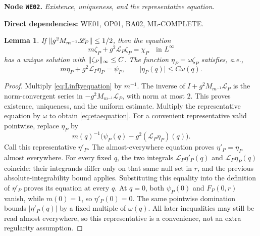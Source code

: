 \documentclass[11pt,a4paper]{article}
\newtheorem{lemma}[theorem]{Lemma}
\theoremstyle{remark}\newtheorem{remark}[theorem]{Remark}
\newcommand{\abs}[1]{\lvert #1\rvert}\newcommand{\rankone}[2]{\lvert #1\rangle\langle #2\rvert}
\newcommand{\node}[3]{\par\Needspace{6\baselineskip}\smallskip\hypertarget{node:#1}{}\label{nodepage:#1}\noindent\textbf{Node \texttt{#1}.} \textit{#2.}\par\noindent\textbf{Direct dependencies:} #3.\par}
\begin{document}
\node{WE02}{Existence, uniqueness, and the representative equation}{WE01, OP01, BA02, ML-COMPLETE}
\begin{lemma}\label{lem:weightedequation}
If $\lVert g^2M_{m^{-1}}\mathscr L_P\rVert\leq1/2$, then the equation
\begin{equation}
 m\zeta_P+g^2\mathscr L_P\zeta_P=\chi_P\quad\text{in }L^\infty\label{eq:Linftyequation}
\end{equation}
has a unique solution with $\lVert \zeta_P\rVert_\infty\leq C$. The function $\eta_P=\omega\zeta_P$ satisfies, a.e.,
\begin{equation}
 m\eta_P+g^2\mathcal L_P\eta_P=\psi_P,\qquad\abs{\eta_P(q)}\leq C\omega(q).
 \label{eq:etaequation}
\end{equation}
\end{lemma}
\begin{proof}
Multiply \eqref{eq:Linftyequation} by $m^{-1}$. The inverse of $I+g^2M_{m^{-1}}\mathscr L_P$ is the norm-convergent series in $-g^2M_{m^{-1}}\mathscr L_P$, with norm at most $2$. This proves existence, uniqueness, and the uniform estimate. Multiply the representative equation by $\omega$ to obtain \eqref{eq:etaequation}. For a convenient representative valid pointwise, replace $\eta_P$ by
\[
 m(q)^{-1}\bigl(\psi_P(q)-g^2(\mathcal L_P\eta_P)(q)\bigr).
\]
Call this representative $\eta'_P$. The almost-everywhere equation proves $\eta'_P=\eta_P$ almost everywhere. For every fixed $q$, the two integrals $\mathcal L_P\eta'_P(q)$ and $\mathcal L_P\eta_P(q)$ coincide: their integrands differ only on that same null set in $r$, and the previous absolute-integrability bound applies. Substituting this equality into the definition of $\eta'_P$ proves its equation at every $q$. At $q=0$, both $\psi_P(0)$ and $F_P(0,r)$ vanish, while $m(0)=1$, so $\eta'_P(0)=0$. The same pointwise domination bounds $|\eta'_P(q)|$ by a fixed multiple of $\omega(q)$. All later inequalities may still be read almost everywhere, so this representative is a convenience, not an extra regularity assumption.
\end{proof}
\end{document}
